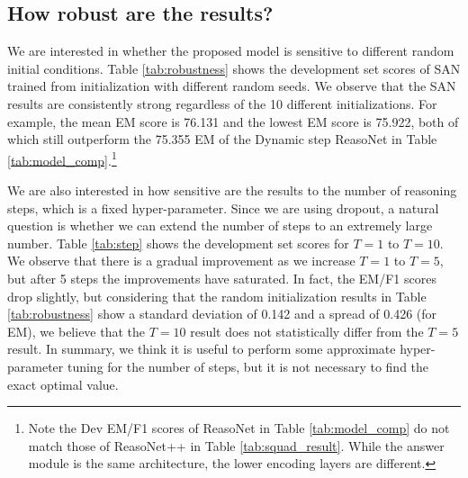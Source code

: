 \documentclass[11pt,a4paper]{article}
\begin{document}
\subsection{How robust are the results?}

We are interested in whether the proposed model is sensitive to different random initial conditions. 
Table \ref{tab:robustness} shows the development set scores of SAN trained from initialization with different random seeds.
We observe that the SAN results are consistently strong regardless of the 10 different initializations. 
For example, the mean EM score is 76.131 and the lowest EM score is 75.922, both of which still outperform the 75.355 EM of the Dynamic step ReasoNet in Table \ref{tab:model_comp}.\footnote{Note the Dev EM/F1 scores of ReasoNet in Table \ref{tab:model_comp} do not match those of ReasoNet++ in Table \ref{tab:squad_result}. While the answer module is the same architecture, the lower encoding layers are different.}

We are also interested in how sensitive are the results to the number of reasoning steps, which is a fixed hyper-parameter. 
Since we are using dropout, a natural question is whether we can extend the number of steps to an extremely large number. 
Table \ref{tab:step} shows the development set scores for $T=1$ to $T=10$.
We observe that there is a gradual improvement as we increase $T=1$ to $T=5$, but after 5 steps the improvements have saturated. 
In fact, the EM/F1 scores drop slightly, but considering that the random initialization results in Table \ref{tab:robustness} show a standard deviation of 0.142 and a spread of 0.426 (for EM), we believe that the $T=10$ result does not statistically differ from the $T=5$ result. 
In summary, we think it is useful to perform some approximate hyper-parameter tuning for the number of steps, but it is not necessary to find the exact optimal value. 
 
\end{document}
